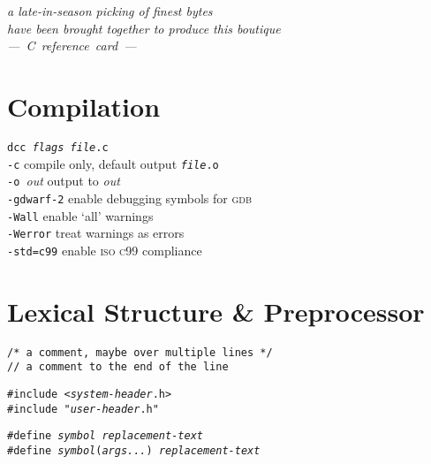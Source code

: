 \documentclass[8pt]{article}
\newcommand{\Cc}[1]{\texttt{#1}}
\newcommand{\cmt}[1]{\textcolor[gray]{.3}{\texttt{#1}}} %
\newcommand{\cpp}[1]{\textcolor{black!20!cyan}{\texttt{\##1}}} %
\newcommand{\quo}[1]{\textcolor{violet!80!black}{\texttt{#1}}} %
\newcommand{\opt}[1]{\textrm{\textit{#1}}} %
\newcommand{\leadingone}{a late-in-season picking of finest bytes}
\newcommand{\leadingtwo}{have been brought together to produce this boutique}
\begin{document}
\begin{multicols}{3}

\begin{center}{\rmfamily
\itshape\leadingone\\ \leadingtwo \\
\Huge ---~C~reference~card~--- }\\
\end{center}

\section*{Compilation}

\Cc{dcc \opt{flags} \opt{file}.c}\\
\hspace*{2.2em}\texttt{-c}\quad
    compile only, default output \Cc{\opt{file}.o}\\
\hspace*{2.2em}\texttt{-o~}\textit{out}\quad
    output to \opt{out}\\
\hspace*{2.2em}\texttt{-gdwarf-2}\quad
    enable debugging symbols for \textsc{gdb}\\
\hspace*{2.2em}\texttt{-Wall}\quad
    enable `all' warnings\\
\hspace*{2.2em}\texttt{-Werror}\quad
    treat warnings as errors\\
\hspace*{2.2em}\texttt{-std=c99}\quad
    enable \textsc{iso c99} compliance

\section*{Lexical Structure \& Preprocessor}

\Cc{\cmt{/* a comment, maybe over multiple lines */}}\\
\Cc{\cmt{// a comment to the end of the line}}

\Cc{\cpp{include} \quo{<\opt{system-header}.h>}}\\
\Cc{\cpp{include} \quo{"\opt{user-header}.h"}}

\Cc{\cpp{define} \opt{symbol} \opt{replacement-text}}\\
\Cc{\cpp{define} \opt{symbol}(\opt{args...}) \opt{replacement-text}}


\end{multicols}
\end{document}
